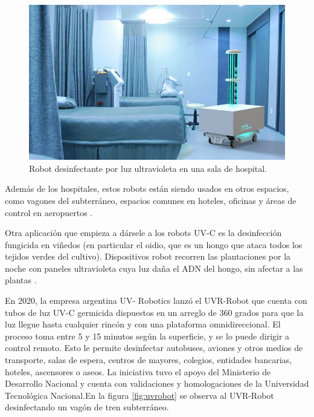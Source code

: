 \begin{figure}[h]
	\centering
	\includegraphics[width=\textwidth]{./Figures/robothospitalario.PNG}
	\caption{Robot desinfectante por luz ultravioleta en una sala de hospital\protect\footnotemark.}
	\label{fig:robotuv}
\end{figure}

Además de los hospitales, estos robots están siendo usados en otros espacios, como vagones del subterráneo, espacios comunes en hoteles, oficinas y áreas de control en aeropuertos \citep{masrobots}.

Otra aplicación que empieza a dársele a los robots UV-C es la desinfección fungicida en viñedos (en particular el oidio, que es un hongo que ataca todos los tejidos verdes del cultivo). Dispositivos robot recorren las plantaciones por la noche con paneles ultravioleta cuya luz daña el ADN del hongo, sin afectar a las plantas \citep{infowine}.

En 2020, la empresa argentina UV- Robotics lanzó el UVR-Robot \citep{UVR} que cuenta con tubos de luz UV-C germicida dispuestos en un arreglo de 360 grados para que la luz llegue hasta cualquier rincón y con una plataforma omnidireccional. El proceso toma  entre 5 y 15 minutos según la superficie, y se lo puede dirigir a control remoto. Esto le permite desinfectar autobuses, aviones y otros medios de transporte, salas de espera, centros de mayores, colegios, entidades bancarias, hoteles, ascensores o aseos. La iniciativa  tuvo el apoyo del Ministerio de Desarrollo Nacional y cuenta con validaciones y homologaciones de la Universidad Tecnológica Nacional.En la figura \ref{fig:uvrobot} se observa al UVR-Robot desinfectando un vagón de tren subterráneo. 

